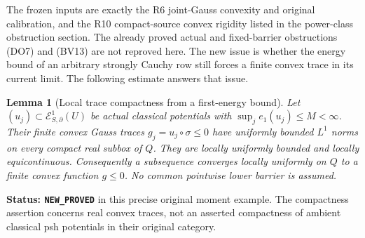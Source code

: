 \documentclass[11pt,a4paper]{article}
\numberwithin{equation}{section}
\newtheorem{lemma}[theorem]{Lemma}
\theoremstyle{definition}
\theoremstyle{remark}
\begin{document}
The frozen inputs are exactly the R6 joint-Gauss convexity and
original calibration, and the R10 compact-source convex rigidity
listed in the power-class obstruction section.  The already proved
actual and fixed-barrier obstructions (DO7) and (BV13) are not
reproved here.  The new issue is whether the energy bound of an
arbitrary strongly Cauchy row still forces a finite convex trace
in its current limit.  The following estimate answers that issue.

\begin{lemma}[Local trace compactness from a first-energy bound]
\label{lem:r11-energy-bounded-convex-trace-compactness}
Let $(u_j)\subset\mathcal E^1_{S,\partial}(U)$ be actual classical
potentials with $\sup_j e_1(u_j)\leq M<\infty$.
Their finite convex Gauss traces $g_j=u_j\circ\sigma\leq0$ have
uniformly bounded $L^1$ norms on every compact real subbox of $Q$.
They are locally uniformly bounded and locally equicontinuous.
Consequently a subsequence converges locally uniformly on $Q$
to a finite convex function $g\leq0$.
No common pointwise lower barrier is assumed.
\end{lemma}

\noindent\textbf{Status: \texttt{NEW\_PROVED}} in this precise
original moment example.  The compactness assertion concerns real
convex traces, not an asserted compactness of ambient classical psh
potentials in their original category.
\end{document}
